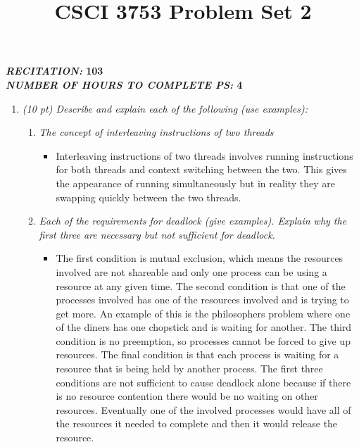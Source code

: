 \documentclass[12pt]{article}
\title{CSCI 3753 Problem Set 2}
\begin{document}

\textbf{\textit{RECITATION:} 103}\\
\textbf{\textit{NUMBER OF HOURS TO COMPLETE PS:} 4}

\begin{enumerate}
\item{\textit{(10 pt) Describe and explain each of the following (use examples):}}
\begin{enumerate}
\item{\textit{The concept of interleaving instructions of two threads}}
\begin{itemize}
  \item Interleaving instructions of two threads involves running instructions for both threads and context switching between the two. This gives the appearance of running simultaneously but in reality they are swapping quickly between the two threads.
\end{itemize}
\item{\textit{Each of the requirements for deadlock (give examples). Explain why the first three are necessary but not sufficient for deadlock.}}
\begin{itemize}
  \item The first condition is mutual exclusion, which means the resources involved are not shareable and only one process can be using a resource at any given time. The second condition is that one of the processes involved has one of the resources involved and is trying to get more. An example of this is the philosophers problem where one of the diners has one chopstick and is waiting for another. The third condition is no preemption, so processes cannot be forced to give up resources. The final condition is that each process is waiting for a resource that is being held by another process. The first three conditions are not sufficient to cause deadlock alone because if there is no resource contention there would be no waiting on other resources. Eventually one of the involved processes would have all of the resources it needed to complete and then it would release the resource.
\end{itemize}
\end{enumerate}


\end{enumerate}
\end{document}
